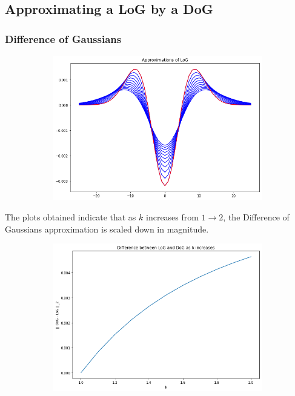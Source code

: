 \documentclass[12pt, oneside]{article}
\begin{document}
\subsection{Approximating a LoG by a DoG}

\subsubsection{Difference of Gaussians}
\begin{figure}[H]
    \centering
    \begin{subfigure}[b]{0.8\textwidth}
        \centering
        \includegraphics[width=\textwidth]{imgs/q1.2_plot1.png}
    \end{subfigure}
    \caption{}
\end{figure}
The plots obtained indicate that as $k$ increases from $1 \to 2$, the Difference of Gaussians approximation is scaled down in magnitude.	
\begin{figure}[H]
    \centering
    \begin{subfigure}[b]{0.4\textwidth}
        \centering
        \includegraphics[width=\textwidth]{imgs/q1.2_plot2.png}
    \end{subfigure}
    \caption{}
\end{figure}
\end{document}

